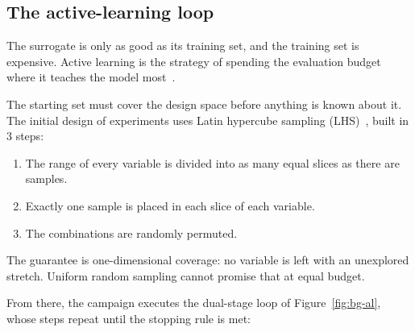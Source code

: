 \subsection{The active-learning loop}
\label{sec:bg-al}

The surrogate is only as good as its training set, and the training set
is expensive. Active learning is the strategy of spending the
evaluation budget where it teaches the model
most~\cite{forrester_book_2008}.

The starting set must cover the design space before anything is known
about it. The initial design of experiments uses Latin hypercube
sampling (LHS)~\cite{mckay_lhs_1979}, built in 3 steps:

\begin{enumerate}
  \item The range of every variable is divided into as many equal
        slices as there are samples.

  \item Exactly one sample is placed in each slice of each variable.

  \item The combinations are randomly permuted.
\end{enumerate}

The guarantee is one-dimensional coverage: no variable is left with an
unexplored stretch. Uniform random sampling cannot promise that at
equal budget.

From there, the campaign executes the dual-stage loop of
Figure~\ref{fig:bg-al}, whose steps repeat until the stopping rule is
met:

